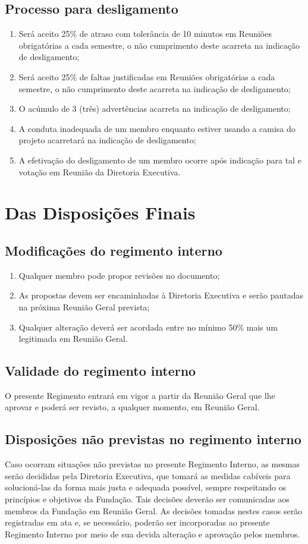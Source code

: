     \subsection{Processo para desligamento}
    \begin{enumerate}
        \item Será aceito 25$\%$ de atraso com tolerância de 10 minutos em Reuniões obrigatórias a cada semestre, o não cumprimento deste acarreta na indicação de desligamento;
        \item Será aceito 25$\%$ de faltas justificadas em Reuniões obrigatórias a cada semestre, o não cumprimento deste acarreta na indicação de desligamento;
        \item O acúmulo de 3 (três) advertências acarreta na indicação de desligamento;
        \item A conduta inadequada de um membro enquanto estiver usando a camisa do projeto acarretará na indicação de desligamento;
        \item A efetivação do desligamento de um membro ocorre após indicação para tal e votação em Reunião da Diretoria Executiva.
    \end{enumerate}

\section{Das Disposições Finais}
    \subsection{Modificações do regimento interno}
        \begin{enumerate}
            \item Qualquer membro pode propor revisões no documento;
            \item As propostas devem ser encaminhadas à Diretoria Executiva e serão pautadas na próxima Reunião Geral prevista;
            \item Qualquer alteração deverá ser acordada entre no mínimo 50$\%$ mais um legitimada em Reunião Geral.
        \end{enumerate}
    \subsection{Validade do regimento interno}
        O presente Regimento entrará em vigor a partir da Reunião Geral que lhe aprovar e poderá ser revisto, a qualquer momento, em Reunião Geral.
    \subsection{Disposições não previstas no regimento interno}
        Caso ocorram situações não previstas no presente Regimento Interno, as mesmas serão decididas pela Diretoria Executiva, que tomará as medidas cabíveis para solucioná-las da forma mais justa e adequada possível, sempre respeitando os princípios e objetivos da Fundação. Tais decisões deverão ser comunicadas aos membros da Fundação em Reunião Geral.
        As decisões tomadas nestes casos serão registradas em ata e, se necessário, poderão ser incorporadas ao presente Regimento Interno por meio de sua devida alteração e aprovação pelos membros.